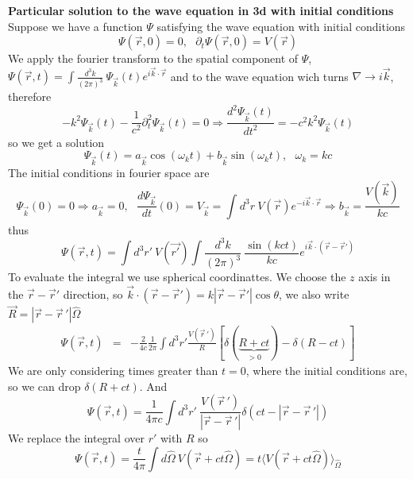 \documentclass[12pt,a4paper]{article}
\newcommand{\dt}[1]{\frac{d #1}{dt}} %
\newcommand{\der}[2]{\frac{d #1}{d #2}} %
\newcommand{\integral}[3]{\int_{#1}^{#2} d #3 \ } %
\begin{document}
\textbf{Particular solution to the wave equation in 3d with initial conditions}\\
Suppose we have a function $\Psi$ satisfying the wave equation with initial conditions
\begin{equation}
	\Psi(\vec{r},0) = 0, \ \ \ \partial_t \Psi(\vec{r},0) = V(\vec{r})
\end{equation}
We apply the fourier transform to the spatial component of $\Psi$, $\Psi(\vec{r},t) = \int{\frac{d^3k}{(2\pi)^3}}\  \Psi_{\vec{k}}(t)e^{i\vec{k}\cdot\vec
r}$ and to the wave equation wich turns $\nabla \rightarrow i\vec{k}$, therefore
\begin{equation}
-k^2 \Psi_{\vec{k}}(t) -\frac{1}{c^2}\partial_t^2\Psi_{\vec{k}}(t) = 0 \Rightarrow \der{^2\Psi_{\vec{k}}(t)}{t^2} = - c^2k^2\Psi_{\vec{k}}(t)
\end{equation}
so we get a solution
\begin{equation}
\Psi_{\vec{k}}(t) = a_{\vec{k}} \cos (\omega_k t) + b_{\vec{k}} \sin (\omega_k t), \ \ \ \omega_k = kc
\end{equation}
The initial conditions in fourier space are
\begin{equation}
	\Psi_{\vec{k}}(0) = 0 \Rightarrow a_{\vec{k}} = 0, \ \ \ \dt{\Psi_{\vec{k}}}(0) = V_{\vec{k}} = \integral{}{}{^3r} V(\vec{r})e^{-i\vec{k}\cdot\vec{r}} \Rightarrow  b_{\vec{k}} = \frac{V(\vec{k})}{kc}
\end{equation}
thus
\begin{equation}
\Psi(\vec{r},t) = \int d^3 r' \ V(\vec{r'}) \int \frac{d^3k}{(2\pi)^3}\ \frac{\sin (kct)}{kc} e^{i\vec{k}\cdot(\vec{r}-\vec{r}')}  
\end{equation}
To evaluate the integral we use spherical coordinattes. We choose the $z$ axis in the $\vec{r}-\vec{r}'$ direction, so $\vec{k}\cdot(\vec{r}-\vec{r}') = k|\vec{r}-\vec{r}'|\cos \theta$, we also write $\vec{R} = |\vec{r}-\vec{r}\,'|\hat{\Omega}$ 
\begin{eqnarray}
	\Psi(\vec{r},t)& = & -\frac{2}{4c} \frac{1}{2\pi} \int d^3r' \frac{V(\vec{r}\,')}{R} \left[\delta(\underbrace{R+ct}_{>0}) - \delta(R-ct) \right]
\end{eqnarray}
We are only considering times greater than $t = 0$, where the initial conditions are, so we can drop $\delta(R+ct)$. And 
\begin{equation}
	\Psi(\vec{r},t) = \frac{1}{4\pi c} \int d^3r' \  \frac{V(\vec{r}\,')}{|\vec{r}-\vec{r}\,'|} \delta(ct-|\vec{r}-\vec{r}\,'|)
\end{equation}
We replace the integral over $r'$ with $R$ so
\begin{equation}
	\Psi(\vec{r},t) = \frac{t}{4\pi} \int d\hat{\Omega} \ V(\vec{r} + ct\hat{\Omega}) = t \langle V(\vec{r} + ct\hat{\Omega}) \rangle_{\hat{\Omega}}
\end{equation}
\end{document}
